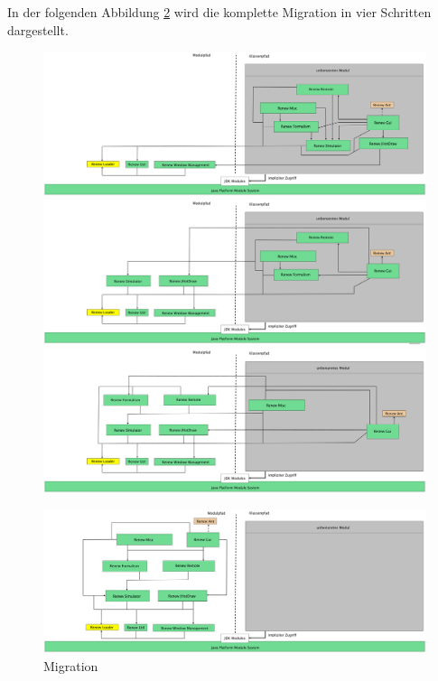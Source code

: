 	In der folgenden Abbildung \ref{fig:migration} wird die komplette Migration in vier Schritten dargestellt.
	\begin{figure}[h!]
	  \centering
	  \includegraphics[width=\textwidth]{material/images/renew_plugin_dependencies-migrate_1.pdf}
	  \includegraphics[width=\textwidth]{material/images/renew_plugin_dependencies-migrate_2.pdf}
  	  \includegraphics[width=\textwidth]{material/images/renew_plugin_dependencies-migrate_3.pdf}
	  \label{fig:migration1}
	\end{figure}
	\begin{figure}[h!]
	  \centering
	  \includegraphics[width=\textwidth]{material/images/renew_plugin_dependencies-migrate_4.pdf}
	  \caption{Migration}
	  \label{fig:migration}
	\end{figure}	

